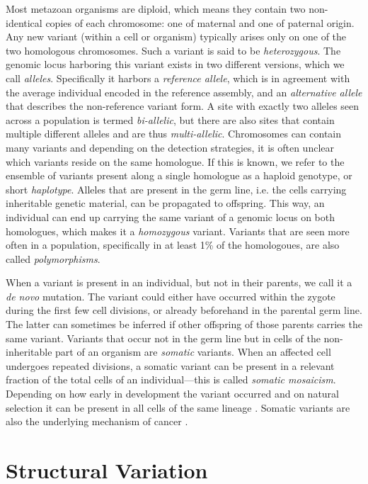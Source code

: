 Most metazoan organisms are diploid, which means they contain two non-identical
copies of each chromosome: one of maternal and one of paternal origin. Any new
variant (within a cell or organism) typically arises only on one of the two
homologous chromosomes. Such a variant is said to be \emph{heterozygous}. The
genomic locus harboring this variant exists in two different versions, which we
call \emph{alleles}. Specifically it harbors a \emph{reference allele}, which is
in agreement with the average individual encoded in the reference assembly, and
an \emph{alternative allele} that describes the non-reference variant form. A
site with exactly two alleles seen across a population is termed
\emph{bi-allelic}, but there are also sites that contain multiple different
alleles and are thus \emph{multi-allelic}. Chromosomes can contain many variants
and depending on the detection strategies, it is often unclear which variants
reside on the same homologue. If this is known, we refer to the ensemble of
variants present along a single homologue as a haploid genotype, or short
\emph{haplotype}. Alleles that are present in the germ line, i.e. the cells
carrying inheritable genetic material, can be propagated to offspring. This way,
an individual can end up carrying the same variant of a genomic locus on both
homologues, which makes it a \emph{homozygous} variant. Variants that are seen
more often in a population, specifically in at least 1\% of the homologoues,
are also called \emph{polymorphisms}.

When a variant is present in an individual, but not in their parents, we call it
a \emph{de novo} mutation. The variant could either have occurred within the
zygote during the first few cell divisions, or already beforehand in the
parental germ line. The latter can sometimes be inferred if other offspring of
those parents carries the same variant. Variants that occur not in the germ line
but in cells of the non-inheritable part of an organism are \emph{somatic}
variants. When an affected cell undergoes repeated divisions, a somatic variant
can be present in a relevant fraction of the total cells of an individual---this
is called \emph{somatic mosaicism}. Depending on how early in development the
variant occurred and on natural selection it can be present in all cells of the
same lineage \citep{Youssoufian2002}. Somatic variants are also the underlying
mechanism of cancer \citep{Campbell2007}.


\section{Structural Variation}
\label{sec:sv}



